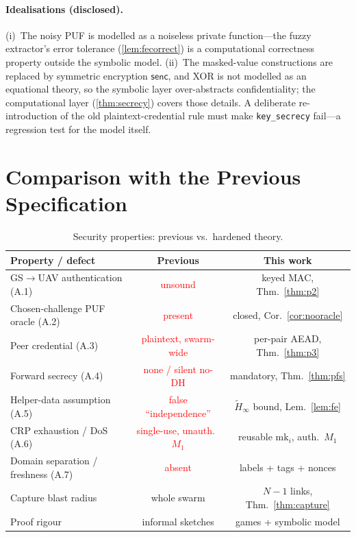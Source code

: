 \documentclass[11pt]{article}
\theoremstyle{plain}
\theoremstyle{definition}
\newcommand{\mk}{\mathrm{mk}}
\newcommand{\entropy}{\widetilde{H}_\infty}
\begin{document}
\paragraph{Idealisations (disclosed).}
(i)~The noisy PUF is modelled as a noiseless private function---the fuzzy
extractor's error tolerance (\cref{lem:fecorrect}) is a computational
correctness property outside the symbolic model. (ii)~The masked-value
constructions are replaced by symmetric encryption $\mathsf{senc}$, and XOR
is not modelled as an equational theory, so the symbolic layer over-abstracts
confidentiality; the computational layer (\cref{thm:secrecy}) covers those
details. A deliberate re-introduction of the old plaintext-credential rule
must make \texttt{key\_secrecy} fail---a regression test for the model
itself.

\section{Comparison with the Previous Specification}
\label{sec:compare}
\begin{table}[h]
\centering
\caption{Security properties: previous vs.\ hardened theory.}
\label{tab:compare}
\small
\begin{tabularx}{\linewidth}{@{}X c c@{}}
\toprule
\textbf{Property / defect} & \textbf{Previous} & \textbf{This work}\\
\midrule
GS$\to$UAV authentication (A.1) & \textcolor{red}{unsound} & keyed MAC, Thm.~\ref{thm:p2}\\
Chosen-challenge PUF oracle (A.2) & \textcolor{red}{present} & closed, Cor.~\ref{cor:nooracle}\\
Peer credential (A.3) & \textcolor{red}{plaintext, swarm-wide} & per-pair AEAD, Thm.~\ref{thm:p3}\\
Forward secrecy (A.4) & \textcolor{red}{none / silent no-DH} & mandatory, Thm.~\ref{thm:pfs}\\
Helper-data assumption (A.5) & \textcolor{red}{false ``independence''} & $\entropy$ bound, Lem.~\ref{lem:fe}\\
CRP exhaustion / DoS (A.6) & \textcolor{red}{single-use, unauth.\ $M_1$} & reusable $\mk_i$, auth.\ $M_1$\\
Domain separation / freshness (A.7) & \textcolor{red}{absent} & labels + tags + nonces\\
Capture blast radius & whole swarm & $N{-}1$ links, Thm.~\ref{thm:capture}\\
Proof rigour & informal sketches & games + symbolic model\\
\bottomrule
\end{tabularx}
\end{table}
\end{document}
